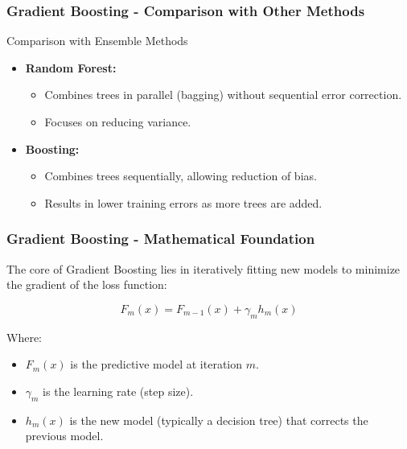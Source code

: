 \documentclass[aspectratio=169]{beamer}
\begin{document}
\begin{frame}[fragile]
    \frametitle{Gradient Boosting - Comparison with Other Methods}
    
    \begin{block}{Comparison with Ensemble Methods}
        \begin{itemize}
            \item \textbf{Random Forest:}
            \begin{itemize}
                \item Combines trees in parallel (bagging) without sequential error correction.
                \item Focuses on reducing variance.
            \end{itemize}

            \item \textbf{Boosting:}
            \begin{itemize}
                \item Combines trees sequentially, allowing reduction of bias.
                \item Results in lower training errors as more trees are added.
            \end{itemize}
        \end{itemize}
    \end{block}
\end{frame}

\begin{frame}[fragile]
    \frametitle{Gradient Boosting - Mathematical Foundation}
    
    The core of Gradient Boosting lies in iteratively fitting new models to minimize the gradient of the loss function:

    \begin{equation}
        F_{m}(x) = F_{m-1}(x) + \gamma_m h_m(x)
    \end{equation}
    
    Where:
    \begin{itemize}
        \item \( F_{m}(x) \) is the predictive model at iteration \( m \).
        \item \( \gamma_m \) is the learning rate (step size).
        \item \( h_m(x) \) is the new model (typically a decision tree) that corrects the previous model.
    \end{itemize}
\end{frame}
\end{document}
